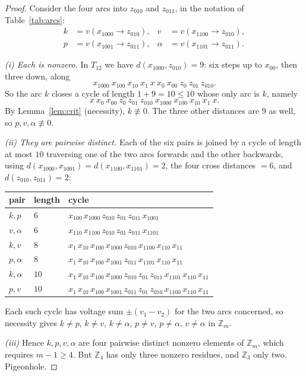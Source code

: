 \documentclass[11pt]{amsart}
\theoremstyle{remark}
\newcommand{\Zm}{\mathbb{Z}_m}
\newcommand{\Tt}{T_{12}}
\begin{document}
\begin{proof}
Consider the four arcs into $z_{010}$ and $z_{011}$, in the notation of
Table~\ref{tab:arcs}:
\begin{align*}
k &= v(x_{1000}\!\to\! z_{010}), & v &= v(x_{1100}\!\to\! z_{010}),\\
p &= v(x_{1001}\!\to\! z_{011}), & \alpha &= v(x_{1101}\!\to\! z_{011}).
\end{align*}

\emph{(i) Each is nonzero.} In $\Tt$ we have $d(x_{1000}, z_{010}) = 9$: six
steps up to $x_{00}$, then three down, along
\[
x_{1000}\ x_{100}\ x_{10}\ x_1\ x\ x_0\ x_{00}\ z_0\ z_{01}\ z_{010}.
\]
So the arc $k$ closes a cycle of length $1 + 9 = 10 \le 10$ whose only arc is
$k$, namely
\[
x\ x_0\ x_{00}\ z_0\ z_{01}\ z_{010}\ x_{1000}\ x_{100}\ x_{10}\ x_1\ x .
\]
By Lemma~\ref{lem:crit} (necessity), $k \not\equiv 0$. The three other
distances are $9$ as well, so $p, v, \alpha \not\equiv 0$.

\emph{(ii) They are pairwise distinct.} Each of the six pairs is joined by a
cycle of length at most $10$ traversing one of the two arcs forwards and the
other backwards, using $d(x_{1000},x_{1001}) = d(x_{1100},x_{1101}) = 2$, the
four cross distances $= 6$, and $d(z_{010},z_{011}) = 2$:
\begin{center}\small
\begin{tabular}{@{}lll@{}}
\toprule
pair & length & cycle\\
\midrule
$k,p$ & $6$ & $x_{100}\,x_{1000}\,z_{010}\,z_{01}\,z_{011}\,x_{1001}$\\
$v,\alpha$ & $6$ & $x_{110}\,x_{1100}\,z_{010}\,z_{01}\,z_{011}\,x_{1101}$\\
$k,v$ & $8$ & $x_1\,x_{10}\,x_{100}\,x_{1000}\,z_{010}\,x_{1100}\,x_{110}\,x_{11}$\\
$p,\alpha$ & $8$ & $x_1\,x_{10}\,x_{100}\,x_{1001}\,z_{011}\,x_{1101}\,x_{110}\,x_{11}$\\
$k,\alpha$ & $10$ & $x_1\,x_{10}\,x_{100}\,x_{1000}\,z_{010}\,z_{01}\,z_{011}\,x_{1101}\,x_{110}\,x_{11}$\\
$p,v$ & $10$ & $x_1\,x_{10}\,x_{100}\,x_{1001}\,z_{011}\,z_{01}\,z_{010}\,x_{1100}\,x_{110}\,x_{11}$\\
\bottomrule
\end{tabular}
\end{center}
Each such cycle has voltage sum $\pm(v_1 - v_2)$ for the two arcs concerned, so
necessity gives $k \ne p$, $k \ne v$, $k \ne \alpha$, $p \ne v$,
$p \ne \alpha$, $v \ne \alpha$ in $\Zm$.

\emph{(iii)} Hence $k, p, v, \alpha$ are four pairwise distinct nonzero
elements of $\Zm$, which requires $m - 1 \ge 4$. But $\mathbb{Z}_4$ has only
three nonzero residues, and $\mathbb{Z}_3$ only two. Pigeonhole.
\end{proof}
\end{document}

